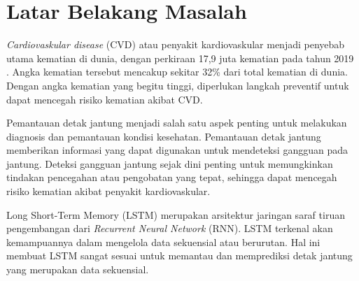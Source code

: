 
\section{Latar Belakang Masalah}

\emph{Cardiovaskular disease} (CVD) atau penyakit kardiovaskular menjadi penyebab utama kematian di dunia, dengan perkiraan 17,9 juta kematian pada tahun 2019 \parencite{worldhealthorganizationCardiovascularDiseasesCVDs2021}. Angka kematian tersebut mencakup sekitar 32\% dari total kematian di dunia. Dengan angka kematian yang begitu tinggi, 
diperlukan langkah preventif untuk dapat mencegah risiko kematian akibat CVD.

Pemantauan detak jantung
menjadi salah satu aspek penting untuk melakukan diagnosis dan pemantauan
kondisi kesehatan.
Pemantauan detak jantung memberikan informasi yang dapat digunakan untuk mendeteksi gangguan pada jantung.
Deteksi gangguan jantung sejak dini penting untuk memungkinkan tindakan pencegahan atau pengobatan yang tepat, sehingga dapat mencegah risiko kematian akibat penyakit kardiovaskular.


Long Short-Term Memory (LSTM) merupakan arsitektur jaringan saraf tiruan pengembangan dari \emph{Recurrent Neural Network} (RNN).
LSTM terkenal akan kemampuannya dalam mengelola data sekuensial atau berurutan.
Hal ini membuat LSTM sangat sesuai untuk memantau dan memprediksi detak jantung yang merupakan data sekuensial.

